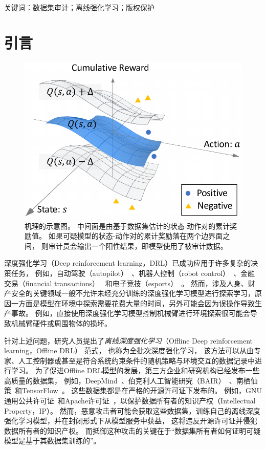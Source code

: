 关键词：数据集审计；离线强化学习；版权保护

\section{引言}
\label{sec:intro}
\begin{figure}[!t]
    \centering
    \includegraphics[width=0.5\hsize]{figure/orl_auditor/intuition-v1.pdf}
    \caption{
    \sysnameo 机理的示意图。
    中间面是由基于数据集估计的状态-动作对的累计奖励值。
    如果可疑模型的状态-动作对的累计奖励落在两个边界面之间，
    则审计员会输出一个阳性结果，即模型使用了被审计数据。}
    \label{fig:intuition}
\end{figure}

深度强化学习（Deep reinforcement learning，DRL）已成功应用于许多复杂的决策任务，
例如，自动驾驶（autopilot）~\cite{FHOL18}、机器人控制（robot control）~\cite{A17}、金融交易（financial transactions）~\cite{DBKRD17} 和电子竞技（esports）~\cite{SSSAHGHBLB17,BBCCDDFFHHJGOPPPRSSSSSTWZ19}。
然而，涉及人身、财产安全的关键领域一般不允许未经充分训练的深度强化学习模型进行探索学习，原因一方面是模型在环境中探索需要花费大量的时间，另外可能会因为误操作导致生产事故。
例如，直接使用深度强化学习模型控制机械臂进行环境探索很可能会导致机械臂硬件或周围物体的损坏。

针对上述问题，研究人员提出了\textit{离线深度强化学习}（Offline Deep reinforcement learning，Offline DRL）\cite{DBLP:journals/corr/abs-2005-01643} 范式，
也称为全批次深度强化学习\cite{DBLP:books/sp/12/LangeGR12}，
该方法可以从由专家、人工控制器或甚至是符合系统约束条件的随机策略与环境交互的数据记录中进行学习。
为了促进Offline DRL模型的发展，第三方企业和研究机构已经发布一些高质量的数据集，
例如，DeepMind~\cite{DBLP:journals/corr/abs-2006-13888}、伯克利人工智能研究（BAIR）~\cite{DBLP:journals/corr/abs-2004-07219}、南栖仙策~\cite{DBLP:journals/corr/abs-2102-00714}和TensorFlow~\cite{tensorflow2015-whitepaper}。
这些数据集都是在严格的开源许可证下发布的。
例如，GNU通用公共许可证~\cite{DBLP:journals/corr/BeattieLTWWKLGV16}和Apache许可证~\cite{DBLP:journals/corr/abs-2006-13888, DBLP:journals/corr/abs-2004-07219, tensorflow2015-whitepaper}，以保护数据所有者的知识产权（Intellectual Property，IP）。
然而，恶意攻击者可能会获取这些数据集，训练自己的离线深度强化学习模型，并在封闭形式下从模型服务中获益，
这将违反开源许可证并侵犯数据所有者的知识产权。
而抵御这种攻击的关键在于“数据集所有者如何证明可疑模型是基于其数据集训练的”。

